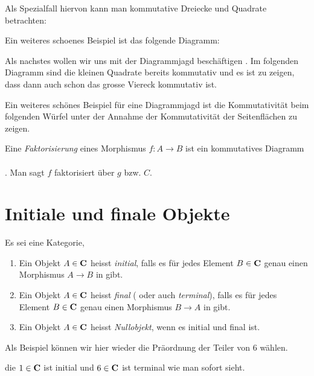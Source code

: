 \documentclass{article}
\begin{document}
\begin{bsp}[Fundamentalgruppoid]
\begin{defi}
		Als Spezialfall hiervon kann man kommutative Dreiecke und Quadrate betrachten:
 		
			
		\end{defi}
			 
		Ein weiteres schoenes Beispiel ist das folgende Diagramm:
		\begin{bsp}
		
		\end{bsp}
		Als nachstes wollen wir uns mit der Diagrammjagd besch\"aftigen \cite[Beispiel 2.4.7]{Bra}.
		Im folgenden Diagramm sind die kleinen Quadrate bereits kommutativ und es ist zu zeigen, dass dann auch schon das grosse Viereck kommutativ ist.
		
		
		Ein weiteres sch\"ones Beispiel f\"ur eine Diagrammjagd ist  die Kommutativit\"at beim folgenden W\"urfel \cite[Quellcode]{tikzcd} unter der Annahme der Kommutativit\"at der Seitenfl\"achen zu zeigen. \\
		

	\begin{defi}[Faktorisierung]
	 \cite[Definition 2.4.8]{Bra}
	Eine \emph{Faktorisierung} eines Morphismus \( f:A \to B \) ist ein kommutatives Diagramm \\
		 \\
	. Man sagt $f$ faktorisiert \"uber $g$ bzw. $ C $.
	\end{defi}
\newpage
\section{Initiale und finale Objekte}
\begin{defi}
 \cite[Definition 2.5.1]{Bra}
	Es sei \CatC eine Kategorie,
	\begin{enumerate}
		\item	 Ein Objekt \( A \in \mathbf{C} \) heisst \emph{initial}, 
		falls es f\"ur jedes Element \( B \in \mathbf{C} \) genau einen Morphismus \(A \to B \) in \CatC gibt.
		\item	 Ein Objekt \( A \in \mathbf{C} \) heisst \emph{final} ( oder auch \emph{terminal}), 
		falls es f\"ur jedes Element \( B \in \mathbf{C} \) genau einen Morphismus \(B \to A \) in \CatC gibt.
		\item	Ein Objekt \( A \in \mathbf{C} \) heisst \emph{Nullobjekt}, wenn es initial und final ist.
	\end{enumerate}
\end{defi}
	Als Beispiel k\"onnen wir hier wieder die Pr\"aordnung der Teiler von 6 w\"ahlen.
	\begin{bsp}
	
	die \( 1 \in \mathbf{C} \) ist initial und  \(6 \in \mathbf{C} \) ist terminal wie man sofort sieht.
	\end{bsp}
	

\end{bsp}
\end{document}
